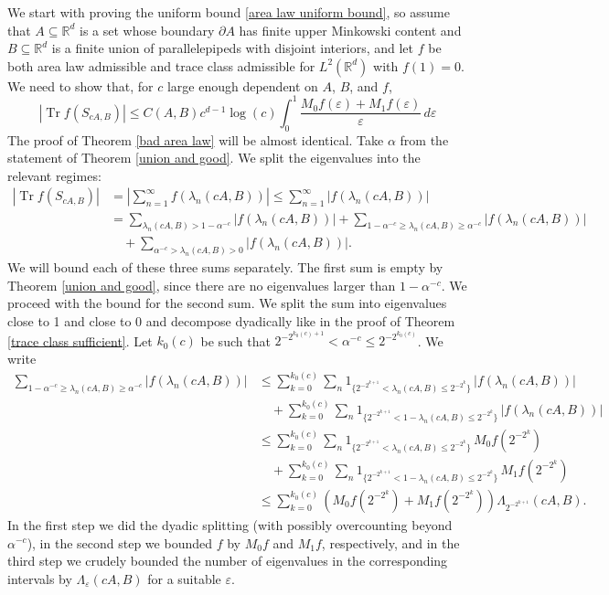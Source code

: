 \documentclass[12pt]{amsart}
\numberwithin{equation}{section}
\newcommand{\R}{\mathbb{R}}
\newcommand{\eps}{\varepsilon}
\begin{document}
We start with proving the uniform bound \eqref{area law uniform bound}, so assume that $A\subseteq \R^d$ is a set whose boundary $\partial A$ has finite upper Minkowski content and $B\subseteq\R^d$ is a finite union of parallelepipeds with disjoint interiors, and let $f$ be both area law admissible and trace class admissible for $L^2(\R^d)$ with $f(1) = 0$. We need to show that, for $c$ large enough dependent on $A$, $B$, and $f$,
\[
|\operatorname{Tr} f(S_{cA, B})| \leq  C(A,B)c^{d-1}\log(c) \int_{0}^1 \frac{M_0 f(\eps) + M_1 f(\eps)}{\eps} \, d\eps
\]
The proof of Theorem \ref{bad area law} will be almost identical. Take $\alpha$ from the statement of Theorem \ref{union and good}. We split the eigenvalues into the relevant regimes:
\begin{equation}\label{three sums}
\begin{aligned}
|\operatorname{Tr} f(S_{cA, B})| &= \left|\sum_{n=1}^\infty f(\lambda_n(cA,B))\right| \le \sum_{n = 1}^\infty |f(\lambda_n(cA,B))|\\
&=\sum_{\lambda_n(cA,B) >1-\alpha^{-c}}|f(\lambda_n(cA,B))|+\sum_{1-\alpha^{-c}\ge\lambda_n(cA,B) \ge\alpha^{-c}}|f(\lambda_n(cA,B))|\\
&\quad +\sum_{\alpha^{-c}>\lambda_n(cA,B) >0}|f(\lambda_n(cA,B))|.
\end{aligned}
\end{equation}
We will bound each of these three sums separately. The first sum is empty by Theorem \ref{union and good}, since there are no eigenvalues larger than $1-\alpha^{-c}$. We proceed with the bound for the second sum. We split the sum into eigenvalues close to 1 and close to 0 and decompose dyadically like in the proof of Theorem \ref{trace class sufficient}. Let $k_0(c)$ be such that $2^{-2^{k_0(c)+1}} < \alpha^{-c} \le 2^{-2^{k_0(c)}}$. We write
\begin{align*}
 \sum_{1-\alpha^{-c}\ge\lambda_n(cA,B)\ge \alpha^{-c}}|f(\lambda_n(cA,B))| &\leq \sum_{k=0}^{k_0(c)} \sum_{n}  1_{\{ 2^{-2^{k+1}}<\lambda_n(cA,B) \le 2^{-2^k} \}} \,  |f(\lambda_n(cA,B))|\\
 &\quad+ \sum_{k=0}^{k_0(c)} \sum_{n}  1_{\{ 2^{-2^{k+1}}<1-\lambda_n(cA,B) \le 2^{-2^k} \}} \,  |f(\lambda_n(cA,B))|\\
 &\leq   \sum_{k=0}^{k_0(c)} \sum_{n}  1_{\{ 2^{-2^{k+1}}<\lambda_n(cA,B) \le 2^{-2^k} \}} \,  M_0 f\left(2^{-2^k}\right)\\
 &\quad+ \sum_{k=0}^{k_0(c)} \sum_{n}  1_{\{ 2^{-2^{k+1}}<1-\lambda_n(cA,B) \le 2^{-2^k} \}} \,  M_1 f\left(2^{-2^k}\right)\\
 &\le \sum_{k=0}^{k_0(c)} \left(M_0 f\left(2^{-2^k}\right) + M_1 f\left(2^{-2^k}\right)\right)\Lambda_{2^{-2^{k+1}}}(cA,B).
\end{align*}
In the first step we did the dyadic splitting (with possibly overcounting beyond $\alpha^{-c}$), in the second step we bounded $f$ by $M_0 f$ and $M_1 f$, respectively, and in the third step we crudely bounded the number of eigenvalues in the corresponding intervals by $\Lambda_{\eps}(cA,B)$ for a suitable $\eps$.
\end{document}
